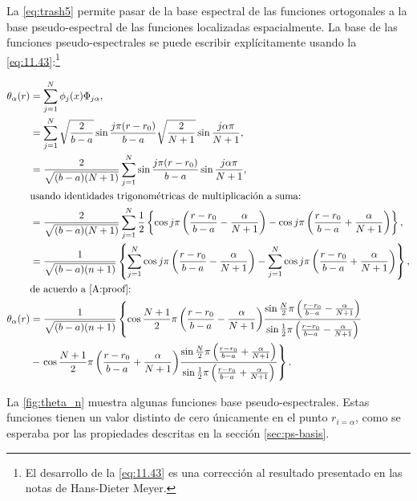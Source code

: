 La \autoref{eq:trash5} permite pasar de la base espectral de las funciones ortogonales a la base pseudo-espectral de las funciones localizadas espacialmente. La base de las funciones pseudo-espectrales se puede escribir explícitamente usando la \autoref{eq:11.43}:\footnote{El desarrollo de la \autoref{eq:11.43} es una corrección al resultado presentado en las notas \cite{Hans} de Hans-Dieter Meyer.}

\begin{align}
  \theta_{\alpha}(r) & = \sum_{j=1}^{N}\phi_j(x)\Phi_{j\alpha}, \label{eq:trash9}\\
    & = \sum_{j=1}^{N} \sqrt{\frac{2}{b-a}}\sin{\frac{j\pi(r-r_0)}{b-a}}\sqrt{\frac{2}{N+1}} \sin{\frac{j\alpha \pi}{N+1}}, \label{eq:trash10}\\
                     & = \frac{2}{\sqrt{(b-a)(N+1)}}\sum_{j=1}^{N}\sin{\frac{j\pi(r-r_0)}{b-a}}\sin{\frac{j\alpha \pi}{N+1}}, \label{eq:trash11} \\
  & \text{\noindent usando identidades trigonométricas de multiplicación a suma:} \nonumber \\
    & = \frac{2}{\sqrt{(b-a)(N+1)}}\sum_{j=1}^{N} \frac{1}{2}\left\{
\cos{j\pi \left(\frac{r-r_0}{b-a} - \frac{\alpha}{N+1}\right)} 
-
\cos{j\pi \left(\frac{r-r_0}{b-a} + \frac{\alpha}{N+1}\right)}
\right\}, \label{eq:trash11} \\
& = \frac{1}{\sqrt{(b-a)(n+1)}} \left\{
\sum_{j=1}^{N}
\cos{j\pi \left(\frac{r-r_0}{b-a} - \frac{\alpha}{N+1}\right)} 
-
\sum_{j=1}^{N}
\cos{j\pi \left(\frac{r-r_0}{b-a} + \frac{\alpha}{N+1}\right)}
                                 \right\}, \label{eq:trash12} \\
   & \text{\noindent de acuerdo a \autoref{A:proof}:} \nonumber \\
\theta_{\alpha}(r) & = \frac{1}{\sqrt{(b-a)(n+1)}} \left\{
\cos{\frac{N+1}{2} \pi \left(\frac{r-r_0}{b-a} - \frac{\alpha}{N+1}\right) }
\frac{\sin{\frac{N}{2}}\pi \left(\frac{r-r_0}{b-a} - \frac{\alpha}{N+1}\right)}{\sin\frac{1}{2}\pi \left(\frac{r-r_0}{b-a} - \frac{\alpha}{N+1}\right)} \right. \nonumber \\
&-
\left. \cos{\frac{N+1}{2} \pi \left(\frac{r-r_0}{b-a} + \frac{\alpha}{N+1}\right) }
\frac{\sin{\frac{N}{2}}\pi \left(\frac{r-r_0}{b-a} + \frac{\alpha}{N+1}\right)}{\sin\frac{1}{2}\pi \left(\frac{r-r_0}{b-a} + \frac{\alpha}{N+1}\right)}\right\}. \label{eq:trash13}
\end{align}

La \autoref{fig:theta_n} muestra algunas funciones base pseudo-espectrales. Estas funciones tienen un valor distinto de cero únicamente en el punto $r_{i=\alpha}$, como se esperaba por las propiedades descritas en la sección \autoref{sec:ps-basis}.

